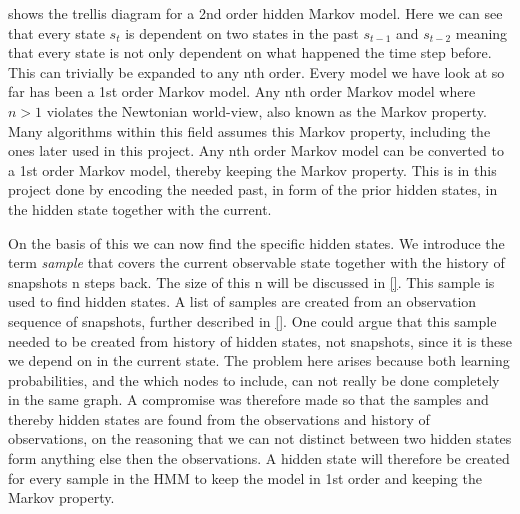  shows the trellis diagram for a 2nd order hidden Markov model. Here we can see that every state $s_t$ is dependent on two states in the past $s_{t-1}$ and $s_{t-2}$ meaning that every state is not only dependent on what happened the time step before. This can trivially be expanded to any nth order. Every model we have look at so far has been a 1st order Markov model. Any nth order Markov model where $n>1$ violates the Newtonian world-view, also known as the Markov property. Many algorithms within this field assumes this Markov property, including the ones later used in this project. Any nth order Markov model can be converted to a 1st order Markov model, thereby keeping the Markov property. This is in this project done by encoding the needed past, in form of the prior hidden states, in the hidden state together with the current.

On the basis of this we can now find the specific hidden states. We introduce the term \emph{sample} that covers the current observable state together with the history of snapshots n steps back. The size of this n will be discussed in \cref{}. This sample is used to find hidden states. A list of samples are created from an observation sequence of snapshots, further described in \cref{}. One could argue that this sample needed to be created from history of hidden states, not snapshots, since it is these we depend on in the current state. The problem here arises because both learning probabilities, and the which nodes to include, can not really be done completely in the same graph. A compromise was therefore made so that the samples and thereby hidden states are found from the observations and history of observations, on the reasoning that we can not distinct between two hidden states form anything else then the observations. A hidden state will therefore be created for every sample in the HMM to keep the model in 1st order and keeping the Markov property.

